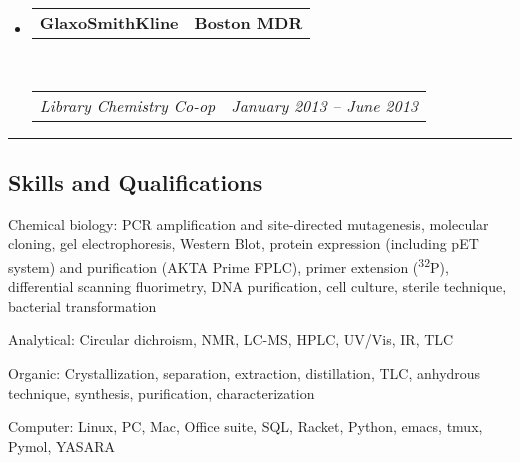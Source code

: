 \documentclass[10pt,letterpaper]{article}
\makeatletter
\newenvironment{indentsection}[1]%
{\begin{list}{}%
  {\setlength{\leftmargin}{#1}}%
  \item[]%
}
{\end{list}}
\newcommand{\headerrow}[2]
{\begin{tabular*}{\linewidth}{l@{\extracolsep{\fill}}r}
  #1 &
  #2 \\
\end{tabular*}}
\makeatother
\begin{document}
\begin{itemize}
\item
  \headerrow
      {\textbf{GlaxoSmithKline}}
      {\textbf{Boston MDR}}
  \\
  \headerrow
      {\emph{Library Chemistry Co-op}}
      {\emph{January 2013 -- June 2013}}

\end{itemize}

\hrule
\vspace{-0.4em}
\subsection*{Skills and Qualifications}

\begin{indentsection}{\parindent}
\begin{description*}
  \item[Chemical biology:]
    PCR amplification and site-directed mutagenesis, molecular cloning,
    gel electrophoresis, Western Blot, protein expression (including pET
    system) and purification (AKTA Prime FPLC), primer extension
  (\textsuperscript{32}P), differential scanning fluorimetry, DNA
    purification, cell culture, sterile technique, bacterial
    transformation
  \item[Analytical:]
    Circular dichroism, NMR, LC-MS, HPLC, UV/Vis, IR, TLC
  \item[Organic:]
    Crystallization, separation, extraction, distillation, TLC,
    anhydrous technique, synthesis, purification, characterization
  \item[Computer:]
    Linux, PC, Mac, Office suite, SQL, Racket, Python, emacs, tmux,
    Pymol, YASARA
\end{description*}
\end{indentsection}
\end{document}
